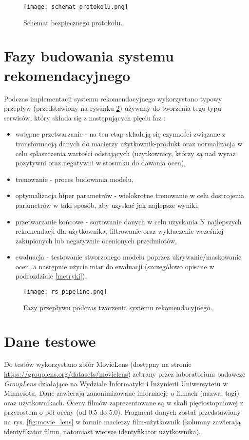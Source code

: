 \begin{figure}[h]
    \texttt{[image: schemat\_protokolu.png]}
    \caption{Schemat bezpiecznego protokołu.}
    \label{fig:schemat}
\end{figure}

\section{Fazy budowania systemu rekomendacyjnego}

Podczas implementacji systemu rekomendacyjnego wykorzystano typowy przepływ (przedstawiony na rysunku \ref{fig:rs_pipeline}) używany do tworzenia tego typu serwisów, który składa się z następujących pięciu faz \cite{rs_in_real}:
\begin{itemize}
    \item wstępne przetwarzanie - na ten etap składają się czynności związane z transformacją danych do macierzy użytkownik-produkt oraz normalizacja w celu spłaszczenia wartości odstających (użytkownicy, którzy są nad wyraz pozytywni oraz negatywni w stosunku do dawania ocen),
    \item trenowanie - proces budowania modelu,
    \item optymalizacja hiper parametrów - wielokrotne trenowanie w celu dostrojenia parametrów w taki sposób, aby uzyskać jak najlepsze wyniki,
    \item przetwarzanie końcowe - sortowanie danych w celu uzyskania N najlepszych rekomendacji dla użytkownika, filtrowanie oraz wykluczenie wcześniej zakupionych lub negatywnie ocenionych przedmiotów,
    \item ewaluacja - testowanie stworzonego modelu poprzez ukrywanie/maskowanie ocen, a następnie użycie miar do ewaluacji (szczegółowo opisane w podrozdziale \ref{metryki}).
\end{itemize}{}

\begin{figure}[h]
    \texttt{[image: rs\_pipeline.png]}
    \caption{Fazy przepływu podczas tworzenia systemu rekomendacyjnego.}
    \label{fig:rs_pipeline}
\end{figure}

\section{Dane testowe}

Do testów wykorzystano zbiór MovieLens (dostępny na stronie \url{https://grouplens.org/datasets/movielens}) zebrany przez laboratorium badawcze \textit{GroupLens} działające na Wydziale Informatyki i Inżynierii Uniwersytetu w Minnesota. Dane zawierają zanonimizowane informacje o filmach (nazwa, tagi) oraz użytkownikach. Oceny filmów zaprezentowane są w skali pięciostopniowej z przyrostem o pół oceny (od 0.5 do 5.0). Fragment danych został przedstawiony na rys. \ref{fig:movie_lens} w formie macierzy film-użytkownik (kolumny zawierają identyfikator filmu, natomiast wiersze identyfikator użytkownika).

